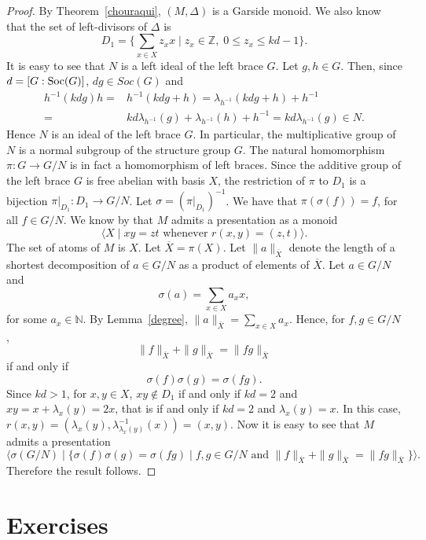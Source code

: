 \begin{proof} By Theorem~\ref{chouraqui}, $(M,\Delta)$ is a Garside
monoid. We also know that the set of left-divisors of $\Delta$ is
$$D_1=\{\sum_{x\in X}z_xx\mid z_x\in \mathbb{Z},\; 0\leq z_x\leq kd-1 \}.$$
It is easy to see that $N$ is a left ideal of the left brace $G$.
Let $g,h\in G$. Then, since $d=[G:\operatorname{Soc}(G)]$, $dg\in Soc(G)$ and
\begin{align*}h^{-1}(kdg)h=&h^{-1}(kdg+h)=\lambda_{h^{-1}}(kdg+h)+h^{-1}\\
=&kd\lambda_{h^{-1}}(g)+\lambda_{h^{-1}}(h)+h^{-1}=kd\lambda_{h^{-1}}(g)\in
N.\end{align*}
Hence $N$ is an ideal of the left brace $G$. In
particular, the multiplicative group of $N$ is a normal subgroup of
the structure group $G$. The natural homomorphism $\pi\colon
G\longrightarrow G/N$ is in fact a homomorphism of left braces.
Since the additive group of the left brace $G$ is free abelian with
basis $X$, the restriction of $\pi$ to $D_1$ is a bijection
$\pi|_{D_1}\colon D_1\longrightarrow G/N$. Let
$\sigma=(\pi|_{D_1})^{-1}$. We have that $\pi(\sigma(f))=f$, for all
$f\in G/N$. We know by \cite{MR1637256} that $M$ admits a presentation
as a monoid
$$\langle X\mid xy=zt\mbox{ whenever }r(x,y)=(z,t)\rangle.$$
The set of atoms of $M$ is $X$. Let $\overline{X}=\pi(X)$. Let $\|
a\|_{\overline{X}}$ denote the length of a shortest decomposition of
$a\in G/N$ as a product of elements of $\overline{X}$. Let $a\in
G/N$ and
$$\sigma(a)=\sum_{x\in X}a_xx,$$
for some $a_x\in \mathbb{N}$. By Lemma~\ref{degree}, $\|
a\|_{\overline{X}}=\sum_{x\in X}a_x$. Hence, for $f,g\in G/N$,
$$\| f\|_{\overline{X}}+\| g\|_{\overline{X}}=\|
fg\|_{\overline{X}}$$ if and only if
$$\sigma(f)\sigma(g)=\sigma(fg).$$
Since $kd>1$, for $x,y\in X$, $xy\notin D_1$ if and only if $kd=2$
and $xy=x+\lambda_x(y)=2x$, that is if and only if $kd=2$ and
$\lambda_x(y)=x$. In this case,
$r(x,y)=(\lambda_x(y),\lambda^{-1}_{\lambda_x(y)}(x))=(x,y)$. Now it
is easy to see that $M$ admits a presentation
$$\langle \sigma(G/N)\mid \{ \sigma(f)\sigma(g)=\sigma(fg)\mid f,g\in G/N\mbox{ and }\| f\|_{\overline{X}}+\| g\|_{\overline{X}}=\| fg\|_{\overline{X}} \}\rangle.$$
Therefore the result follows.
\end{proof}





\section*{Exercises}

